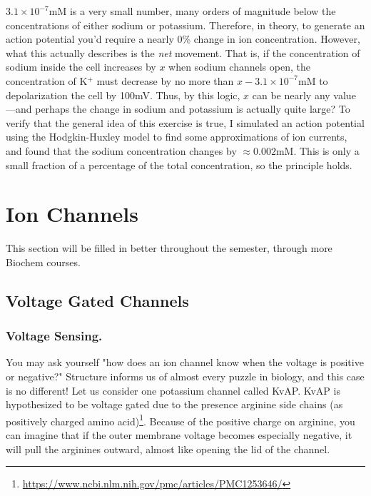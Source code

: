 $3.1 \times 10^{-7} \mathrm{mM}$ is a very small number, many orders of magnitude below the concentrations of either sodium or potassium. Therefore, in theory, to generate an action potential you'd require a nearly 0\% change in ion concentration. However, what this actually describes is the \textit{net} movement. That is, if the concentration of sodium inside the cell increases by $x$ when sodium channels open, the concentration of K$^+$ must decrease by no more than $x - 3.1 \times 10^{-7} \mathrm{mM}$ to depolarization the cell by 100mV. Thus, by this logic, $x$ can be nearly any value---and perhaps the change in sodium and potassium is actually quite large? To verify that the general idea of this exercise is true, I simulated an action potential using the Hodgkin-Huxley model to find some approximations of ion currents, and found that the sodium concentration changes by $\approx 0.002$mM. This is only a small fraction of a percentage of the total concentration, so the principle holds. 




\section{Ion Channels}


This section will be filled in better throughout the semester, through more Biochem courses. 


\subsection{Voltage Gated Channels}


\subsubsection{Voltage Sensing.}
You may ask yourself "how does an ion channel know when the voltage is positive or negative?" Structure informs us of almost every puzzle in biology, and this case is no different! Let us consider one potassium channel called KvAP. KvAP is hypothesized to be voltage gated due to the presence arginine side chains (as positively charged amino acid)\footnote{\url{https://www.ncbi.nlm.nih.gov/pmc/articles/PMC1253646/}}. Because of the positive charge on arginine, you can imagine that if the outer membrane voltage becomes especially negative, it will pull the arginines outward, almost like opening the lid of the channel.



